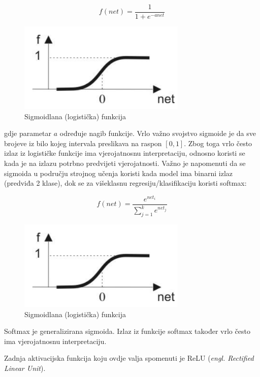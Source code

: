 \begin{equation}
f(net) = \frac{1}{1 + e^{-a net}}
\label{eq:sigmoid}
\end{equation}

\begin{figure}[H]
\centering
\includegraphics[width=8cm]{img/Sigmoid.png}
\caption{Sigmoidlana (logistička) funkcija}
\label{img:sigmoid}
\end{figure}

gdje parametar $a$ određuje nagib funkcije. Vrlo važno svojstvo sigmoide je da sve brojeve iz bilo kojeg intervala preslikava na raspon $[0,1]$. Zbog toga vrlo često izlaz iz logističke funkcije ima vjerojatnosnu interpretaciju, odnosno koristi se kada je na izlazu potrbno predvijeti vjerojatnosti. Važno je napomenuti da se sigmoida u području strojnog učenja koristi kada model ima binarni izlaz (predviđa 2 klase), dok se za višeklasnu regresiju/klasifikaciju koristi softmax:

\begin{equation}
f(net) = \frac{e^{net_i}}{\sum_{j=1}^{k} e^{net_j}}
\label{eq:sigmoid}
\end{equation}

\begin{figure}[H]
\centering
\includegraphics[width=8cm]{img/Sigmoid.png}
\caption{Sigmoidlana (logistička) funkcija}
\label{img:sigmoid}
\end{figure}

Softmax je generalizirana sigmoida. Izlaz iz funkcije softmax također vrlo često ima vjerojatnosnu interpretaciju. 

Zadnja aktivacijska funkcija koju ovdje valja spomenuti je ReLU (\textit{engl. Rectified Linear Unit}). 

